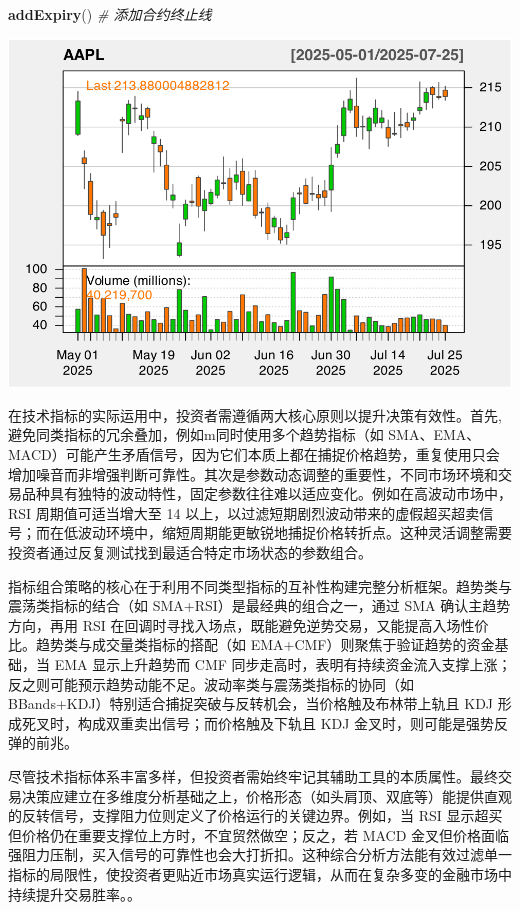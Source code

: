 \documentclass[]{ctexbook}
\newenvironment{Shaded}{\begin{snugshade}}{\end{snugshade}}
\newcommand{\CommentTok}[1]{\textcolor[rgb]{0.56,0.35,0.01}{\textit{#1}}}
\newcommand{\FunctionTok}[1]{\textcolor[rgb]{0.13,0.29,0.53}{\textbf{#1}}}
\newcommand{\NormalTok}[1]{#1}
\begin{document}
\begin{Shaded}
\begin{Highlighting}[]
\FunctionTok{addExpiry}\NormalTok{()  }\CommentTok{\# 添加合约终止线}
\end{Highlighting}
\end{Shaded}

\includegraphics[width=0.9\linewidth]{QuantmodHandbook_files/figure-latex/expiry_ex-2}

在技术指标的实际运用中，投资者需遵循两大核心原则以提升决策有效性。首先,避免同类指标的冗余叠加，例如m同时使用多个趋势指标（如 SMA、EMA、MACD）可能产生矛盾信号，因为它们本质上都在捕捉价格趋势，重复使用只会增加噪音而非增强判断可靠性。其次是参数动态调整的重要性，不同市场环境和交易品种具有独特的波动特性，固定参数往往难以适应变化。例如在高波动市场中，RSI 周期值可适当增大至 14 以上，以过滤短期剧烈波动带来的虚假超买超卖信号；而在低波动环境中，缩短周期能更敏锐地捕捉价格转折点。这种灵活调整需要投资者通过反复测试找到最适合特定市场状态的参数组合。

指标组合策略的核心在于利用不同类型指标的互补性构建完整分析框架。趋势类与震荡类指标的结合（如 SMA+RSI）是最经典的组合之一，通过 SMA 确认主趋势方向，再用 RSI 在回调时寻找入场点，既能避免逆势交易，又能提高入场性价比。趋势类与成交量类指标的搭配（如 EMA+CMF）则聚焦于验证趋势的资金基础，当 EMA 显示上升趋势而 CMF 同步走高时，表明有持续资金流入支撑上涨；反之则可能预示趋势动能不足。波动率类与震荡类指标的协同（如 BBands+KDJ）特别适合捕捉突破与反转机会，当价格触及布林带上轨且 KDJ 形成死叉时，构成双重卖出信号；而价格触及下轨且 KDJ 金叉时，则可能是强势反弹的前兆。

尽管技术指标体系丰富多样，但投资者需始终牢记其辅助工具的本质属性。最终交易决策应建立在多维度分析基础之上，价格形态（如头肩顶、双底等）能提供直观的反转信号，支撑阻力位则定义了价格运行的关键边界。例如，当 RSI 显示超买但价格仍在重要支撑位上方时，不宜贸然做空；反之，若 MACD 金叉但价格面临强阻力压制，买入信号的可靠性也会大打折扣。这种综合分析方法能有效过滤单一指标的局限性，使投资者更贴近市场真实运行逻辑，从而在复杂多变的金融市场中持续提升交易胜率。。
\end{document}
